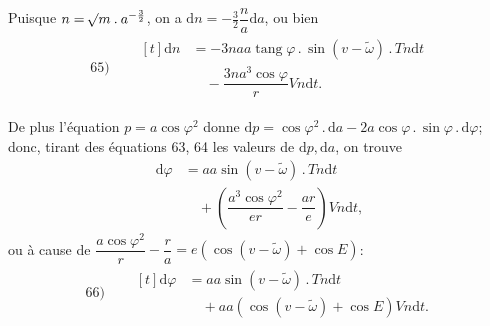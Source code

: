 Puisque \(n=\mathord{{}^{}\!\surd}m\mathbin{.}a^{-\frac32}\), on a \(\mathrm{d}n=-\tfrac32\dfrac{n}{a}\mathrm{d}a\), ou bien
\[
\begin{array}{rl}
65)\quad&\begin{aligned}[t]\mathrm{d}n&=-3naa\operatorname{tang}\varphi\mathbin{.}\sin(v-\tilde\omega)\mathbin{.}Tn\mathrm{d}t\\&\quad-\dfrac{3na^3\cos\varphi}{r}Vn\mathrm{d}t.\end{aligned}
\end{array}
\]
\par De plus l’équation \(p=a\cos\varphi^2\) donne \(\mathrm{d}p=\cos\varphi^2\mathbin{.}\mathrm{d}a-2a\cos\varphi\mathbin{.}\sin\varphi\mathbin{.}\mathrm{d}\varphi\); donc, tirant des équations 63, 64 les valeurs de \(\mathrm{d}p,\mathrm{d}a\), on trouve
\[
\begin{aligned}
\mathrm{d}\varphi&=aa\sin(v-\tilde\omega)\mathbin{.}Tn\mathrm{d}t\\
&\quad+\left(\dfrac{a^3\cos\varphi^2}{er}-\dfrac{ar}{e}\right)Vn\mathrm{d}t,
\end{aligned}
\]
ou à cause de \(\dfrac{a\cos\varphi^2}{r}-\dfrac{r}{a}=e(\cos(v-\tilde\omega)+\cos E)\):
\[
\begin{array}{rl}
66)\quad&\begin{aligned}[t]\mathrm{d}\varphi&=aa\sin(v-\tilde\omega)\mathbin{.}Tn\mathrm{d}t\\&\quad+aa(\cos(v-\tilde\omega)+\cos E)Vn\mathrm{d}t.\end{aligned}
\end{array}
\]
